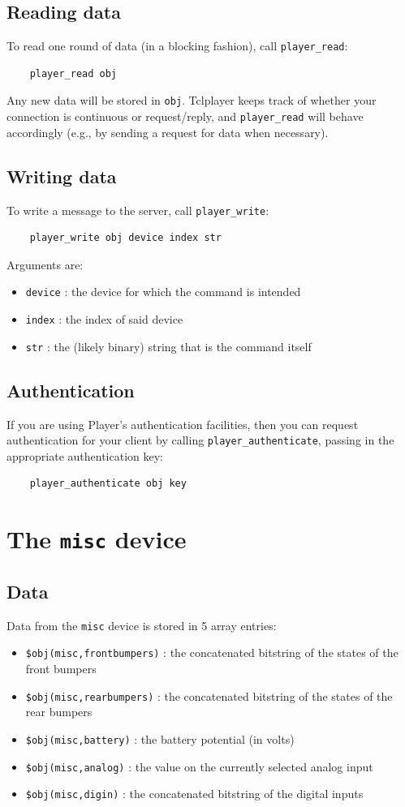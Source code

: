 \documentclass[11pt]{article}
\begin{document}
\subsection{Reading data}
To read one round of data (in a blocking fashion), call {\tt player\_read}:
\begin{verbatim}
    player_read obj
\end{verbatim}
Any new data will be stored in {\tt obj}.  Tclplayer keeps track of whether
your connection is continuous or request/reply, and {\tt player\_read} will
behave accordingly (e.g., by sending a request for data when necessary).

\subsection{Writing data}
To write a message to the server, call {\tt player\_write}:
\begin{verbatim}
    player_write obj device index str
\end{verbatim}
Arguments are:
\begin{itemize}
\item {\tt device} : the device for which the command is intended
\item {\tt index} : the index of said device
\item {\tt str} : the (likely binary) string that is the command itself
\end{itemize}

\subsection{Authentication}
If you are using Player's authentication facilities, then you can
request authentication for your client by calling {\tt player\_authenticate},
passing in the appropriate authentication key:
\begin{verbatim}
    player_authenticate obj key
\end{verbatim}

\section{The {\tt misc} device}
\subsection{Data}
Data from the {\tt misc} device is stored in 5 array entries:
\begin{itemize}
\item {\tt \$obj(misc,frontbumpers)} : the concatenated bitstring of the states
of the front bumpers
\item {\tt \$obj(misc,rearbumpers)} : the concatenated bitstring of the states
of the rear bumpers
\item {\tt \$obj(misc,battery)} : the battery potential (in volts)
\item {\tt \$obj(misc,analog)} : the value on the currently selected analog
input
\item {\tt \$obj(misc,digin)} : the concatenated bitstring of the digital
inputs
\end{itemize}
\end{document}
